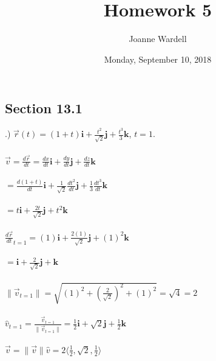 \documentclass[12pt]{article}
\title{\vspace{-2.0cm}Homework 5}
\author{Joanne Wardell}
\date{Monday, September 10, 2018}
\begin{document}
\maketitle


\subsection*{Section 13.1}
.) $\vec{r}(t) = (1 + t)\mathbf{i} + \frac{t^{2}}{\sqrt{2}}\mathbf{j} + \frac{t^{3}}{3}\mathbf{k}$, \hspace{10pt} $t = 1$.\\\\
\noindent $\vec{v} = \frac{d\vec{r}}{dt} = \frac{dx}{dt}\mathbf{i} + \frac{dy}{dt}\mathbf{j} + \frac{dz}{dt}\mathbf{k}$\\\\
\noindent $=\frac{d(1 + t)}{dt}\mathbf{i} + \frac{1}{\sqrt{2}}\frac{dt^{2}}{dt}\mathbf{j} + \frac{1}{3}\frac{dt^{3}}{dt}\mathbf{k}$\\\\
\noindent $=t\mathbf{i} + \frac{2t}{\sqrt{2}}\mathbf{j} + t^{2}\mathbf{k}$\\\\
\noindent $\frac{d\vec{r}}{dt}_{t= 1} =  (1)\mathbf{i} + \frac{2(1)}{\sqrt{2}}\mathbf{j} + (1)^{2}\mathbf{k}$\\\\
\noindent $= \mathbf{i} + \frac{2}{\sqrt{2}}\mathbf{j} + \mathbf{k}$\\\\
\noindent $\| \vec{v}_{t = 1} \|  = \sqrt{(1)^{2} + (\frac{2}{\sqrt{2}})^{2} + (1)^{2}} = \sqrt{4} = 2$\\\\
\noindent $\hat{v}_{t = 1} = \frac{\vec{v}_{t = 1}}{\| \vec{v}_{t = 1} \| } = \frac{1}{2}\mathbf{i} + \sqrt{2}\mathbf{j} + \frac{1}{2}\mathbf{k}$\\\\
\noindent $\vec{v} = \| \vec{v} \|  \hat{v}= 2 \langle \frac{1}{2} , \sqrt{2},  \frac{1}{2}\rangle$\\\\
\end{document}

